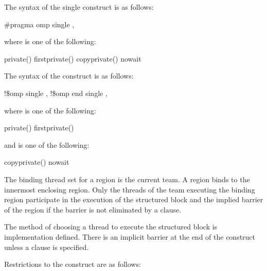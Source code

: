 \parbox{\linewidth}{%
\syntax
\ccppspecificstart}
The syntax of the single construct is as follows:

\begin{boxedcode}
\#pragma omp single \plc{[clause[ [},\plc{] clause] ... ] new-line}
\end{boxedcode}

\begin{samepage}
where  is one of the following:

\begin{indentedcodelist}
private()
firstprivate()
copyprivate()
nowait
\end{indentedcodelist}
\ccppspecificend
\end{samepage}

\fortranspecificstart
The syntax of the  construct is as follows:

\begin{boxedcode}
!\$omp single \plc{[clause[ [},\plc{] clause] ... ]}
!\$omp end single \plc{[end\_clause[ [},\plc{] end\_clause] ... ]}
\end{boxedcode}

where  is one of the following:

\begin{indentedcodelist}
private()
firstprivate()
\end{indentedcodelist}

and  is one of the following: 

\begin{indentedcodelist}
copyprivate()
nowait
\end{indentedcodelist}
\fortranspecificend

\binding
The binding thread set for a  region is the current team. A  region 
binds to the innermost enclosing  region. Only the threads of the team 
executing the binding  region participate in the execution of the structured 
block and the implied barrier of the  region if the barrier is not eliminated by a 
 clause.

\descr
The method of choosing a thread to execute the structured block is implementation 
defined. There is an implicit barrier at the end of the  construct unless a 
 clause is specified. 

\restrictions
Restrictions to the  construct are as follows: 

